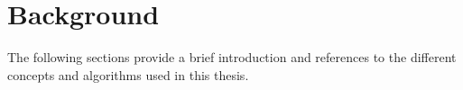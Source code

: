 \section{Background}
\label{sec:background}
The following sections provide a brief introduction and references to the different concepts and algorithms used in this thesis.









